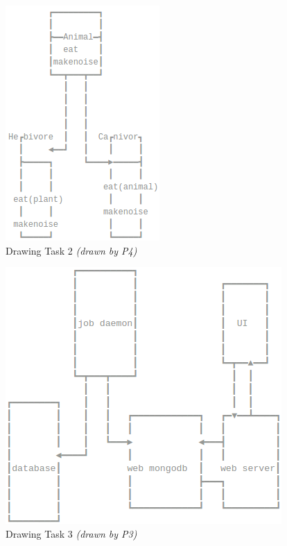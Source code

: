 \documentclass{sig-alternate}
\begin{document}
\begin{figure}[H]
\centering
\includegraphics[scale=.35]{drawing_task_2.png}
\caption{Drawing Task 2 \textit{(drawn by P4)}}
\label{fig:drawing_task_2}
\end{figure}

\begin{figure}[H]
\centering
\includegraphics[scale=.35]{drawing_task_3.png}
\caption{Drawing Task 3 \textit{(drawn by P3)}}
\label{fig:drawing_task_3}
\end{figure}
\end{document}
